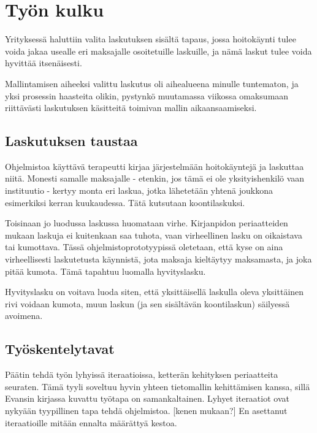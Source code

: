 \hypertarget{tyuxf6n-kulku}{%
\chapter{Työn kulku}\label{tyuxf6n-kulku}}

Yrityksessä haluttiin valita laskutuksen sisältä tapaus, jossa
hoitokäynti tulee voida jakaa usealle eri maksajalle osoitetuille
laskuille, ja nämä laskut tulee voida hyvittää itsenäisesti.

Mallintamisen aiheeksi valittu laskutus oli aihealueena minulle
tuntematon, ja yksi prosessin haasteita olikin, pystynkö muutamassa
viikossa omaksumaan riittävästi laskutuksen käsitteitä toimivan mallin
aikaansaamiseksi.

\hypertarget{laskutuksen-taustaa}{%
\section{Laskutuksen taustaa}\label{laskutuksen-taustaa}}

Ohjelmistoa käyttävä terapeutti kirjaa järjestelmään hoitokäyntejä ja
laskuttaa niitä. Monesti samalle maksajalle - etenkin, jos tämä ei ole
yksityishenkilö vaan instituutio - kertyy monta eri laskua, jotka
lähetetään yhtenä joukkona esimerkiksi kerran kuukaudessa. Tätä
kutsutaan koontilaskuksi.

Toisinaan jo luodussa laskussa huomataan virhe. Kirjanpidon
periaatteiden mukaan laskuja ei kuitenkaan saa tuhota, vaan virheellinen
lasku on oikaistava tai kumottava. Tässä ohjelmistoprototyypissä
oletetaan, että kyse on aina virheellisesti laskutetusta käynnistä, jota
maksaja kieltäytyy maksamasta, ja joka pitää kumota. Tämä tapahtuu
luomalla hyvityslasku.

Hyvityslasku on voitava luoda siten, että yksittäisellä laskulla oleva
yksittäinen rivi voidaan kumota, muun laskun (ja sen sisältävän
koontilaskun) säilyessä avoimena.

\hypertarget{tyuxf6skentelytavat}{%
\section{Työskentelytavat}\label{tyuxf6skentelytavat}}

Päätin tehdä työn lyhyissä iteraatioissa, ketterän kehityksen
periaatteita seuraten. Tämä tyyli soveltuu hyvin yhteen tietomallin
kehittämisen kanssa, sillä Evansin kirjassa kuvattu työtapa on
samankaltainen. Lyhyet iteraatiot ovat nykyään tyypillinen tapa tehdä
ohjelmistoa. {[}kenen mukaan?{]} En asettanut iteraatioille mitään
ennalta määrättyä kestoa.

